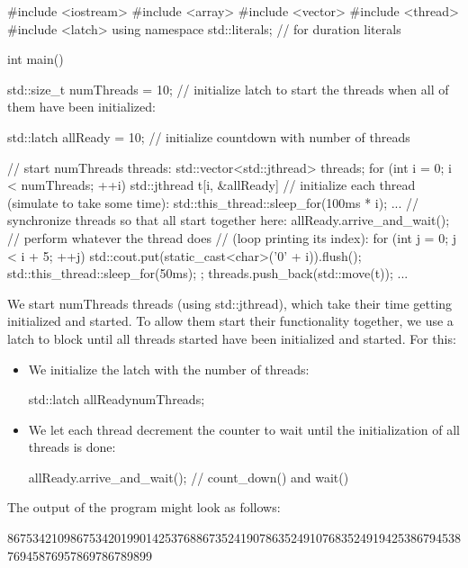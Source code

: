 \begin{cpp}
#include <iostream>
#include <array>
#include <vector>
#include <thread>
#include <latch>
using namespace std::literals; // for duration literals

int main()
{
	std::size_t numThreads = 10;
	// initialize latch to start the threads when all of them have been initialized:
	
	std::latch allReady = 10; // initialize countdown with number of threads
	
	// start numThreads threads:
	std::vector<std::jthread> threads;
	for (int i = 0; i < numThreads; ++i) {
		std::jthread t{[i, &allReady] {
				// initialize each thread (simulate to take some time):
				std::this_thread::sleep_for(100ms * i);
				...
				// synchronize threads so that all start together here:
				allReady.arrive_and_wait();
				// perform whatever the thread does
				// (loop printing its index):
				for (int j = 0; j < i + 5; ++j) {
					std::cout.put(static_cast<char>('0' + i)).flush();
					std::this_thread::sleep_for(50ms);
				}
		}};
		threads.push_back(std::move(t));
	}
	...
}
\end{cpp}

We start numThreads threads (using std::jthread), which take their time getting initialized and started. To allow them start their functionality together, we use a latch to block until all threads started have been initialized and started. For this:

\begin{itemize}
\item 
We initialize the latch with the number of threads:

\begin{cpp}
std::latch allReady{numThreads};
\end{cpp}

\item
We let each thread decrement the counter to wait until the initialization of all threads is done:

\begin{cpp}
allReady.arrive_and_wait(); // count_down() and wait()
\end{cpp}

\end{itemize}

The output of the program might look as follows:

\begin{shell}
86753421098675342019901425376886735241907863524910768352491942538679453876945876957869786789899
\end{shell}

